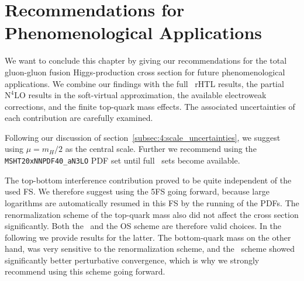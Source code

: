 \section{Recommendations for Phenomenological Applications} \label{sec:6:recommendations}
We want to conclude this chapter by giving our recommendations for the total gluon-gluon fusion Higgs-production cross section for future phenomenological applications. We combine our findings with the full \NNNLO\ \acs{rHTL} results, the partial $\mathrm{N}^4\mathrm{LO}$ results in the soft-virtual approximation, the available electroweak corrections, and the finite top-quark mass effects. The associated uncertainties of each contribution are carefully examined.

Following our discussion of section~\ref{subsec:4:scale_uncertainties}, we suggest using $\mu = m_H/2$ as the central scale. Further we recommend using the \texttt{MSHT20xNNPDF40\_aN3LO} \acs{PDF} set until full \NNNLO\ sets become available.

The top-bottom interference contribution proved to be quite independent of the used \acs{FS}. We therefore suggest using the 5\acs{FS} going forward, because large logarithms are automatically resumed in this \acs{FS} by the running of the \acs{PDF}s. The renormalization scheme of the top-quark mass also did not affect the cross section significantly. Both the \MS\ and the \acs{OS} scheme are therefore valid choices. In the following we provide results for the latter. The bottom-quark mass on the other hand, was very sensitive to the renormalization scheme, and the \MS\ scheme showed significantly better perturbative convergence, which is why we strongly recommend using this scheme going forward.

